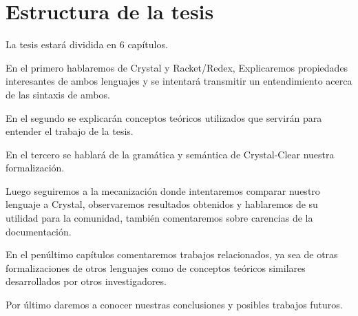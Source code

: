 \section{Estructura de la tesis}

La tesis estará dividida en 6 capítulos.

En el primero hablaremos de Crystal
 y Racket/Redex, Explicaremos propiedades interesantes de ambos lenguajes y
 se intentará transmitir un entendimiento acerca de las sintaxis de ambos.

 En el segundo se explicarán conceptos teóricos utilizados que servirán
 para entender el trabajo de la tesis.
 
 En el tercero se hablará de la gramática
 y semántica de Crystal-Clear nuestra formalización.
 
 Luego seguiremos
 a la mecanización donde intentaremos comparar nuestro lenguaje a Crystal,
 observaremos resultados obtenidos y hablaremos de su utilidad para la comunidad,
 también comentaremos sobre carencias de la documentación.
 
 En el penúltimo capítulos
 comentaremos trabajos relacionados, ya sea de otras formalizaciones
 de otros lenguajes como de conceptos teóricos similares desarrollados por otros
 investigadores.
 
 Por último daremos a conocer nuestras conclusiones y posibles
 trabajos futuros.
 
